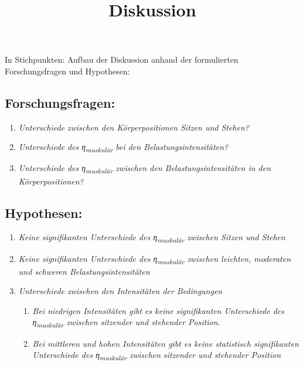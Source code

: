 \documentclass[
  letterpaper,
  DIV=11]{scrartcl}
\title{Diskussion}
\author{}
\date{}
\begin{document}
\maketitle

In Stichpunkten: Aufbau der Diskussion anhand der formulierten
Forschungsfragen und Hypothesen:

\subsection{Forschungsfragen:}\label{forschungsfragen}

\begin{enumerate}
\def\labelenumi{\arabic{enumi}.}
\item
  \emph{Unterschiede zwischen den Körperpositionen Sitzen und Stehen?}
\item
  \emph{Unterschiede des η\textsubscript{muskulär} bei den
  Belastungsintensitäten?}
\item
  \emph{Unterschiede des η\textsubscript{muskulär} zwischen den
  Belastungsintensitäten in den Körperpositionen?}
\end{enumerate}

\subsection{Hypothesen:}\label{hypothesen}

\begin{enumerate}
\def\labelenumi{\arabic{enumi}.}
\item
  \emph{Keine signifikanten Unterschiede des η\textsubscript{muskulär}
  zwischen Sitzen und Stehen}
\item
  \emph{Keine signifikanten Unterschiede des η\textsubscript{muskulär}
  zwischen leichten, moderaten und schweren Belastungsintensitäten}
\item
  \emph{Unterschiede zwischen den Intensitäten der Bedingungen}

  \begin{enumerate}
  \def\labelenumii{\arabic{enumii}.}
  \item
    \emph{Bei niedrigen Intensitäten gibt es keine signifikanten
    Unterschiede des η\textsubscript{muskulär} zwischen sitzender und
    stehender Position.}
  \item
    \emph{Bei mittleren und hohen Intensitäten gibt es keine statistisch
    signifikanten Unterschiede des η\textsubscript{muskulär} zwischen
    sitzender und stehender Position}
  \end{enumerate}
\end{enumerate}
\end{document}
